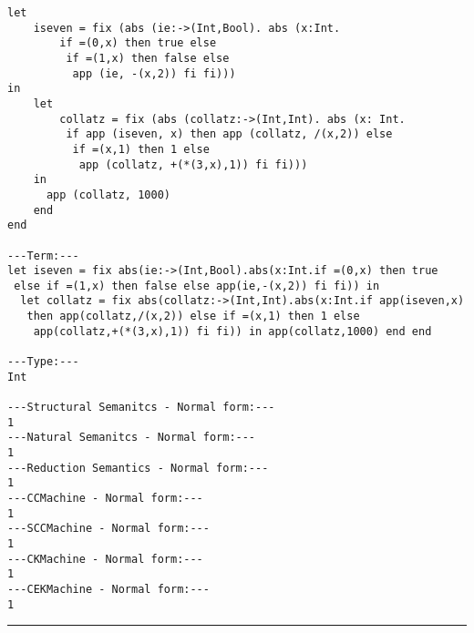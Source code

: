 \documentclass[10pt]{article}
\newcommand{\horrule}[1]{\rule{\linewidth}{#1}}
\begin{document}
\begin{lstlisting}
let
	iseven = fix (abs (ie:->(Int,Bool). abs (x:Int.
		if =(0,x) then true else
		 if =(1,x) then false else
		  app (ie, -(x,2)) fi fi)))
in
	let
		collatz = fix (abs (collatz:->(Int,Int). abs (x: Int.
		 if app (iseven, x) then app (collatz, /(x,2)) else
		  if =(x,1) then 1 else
		   app (collatz, +(*(3,x),1)) fi fi)))
	in
	  app (collatz, 1000)
	end
end

---Term:---
let iseven = fix abs(ie:->(Int,Bool).abs(x:Int.if =(0,x) then true
 else if =(1,x) then false else app(ie,-(x,2)) fi fi)) in
  let collatz = fix abs(collatz:->(Int,Int).abs(x:Int.if app(iseven,x)
   then app(collatz,/(x,2)) else if =(x,1) then 1 else
    app(collatz,+(*(3,x),1)) fi fi)) in app(collatz,1000) end end

---Type:---
Int

---Structural Semanitcs - Normal form:---
1
---Natural Semanitcs - Normal form:---
1
---Reduction Semantics - Normal form:---
1
---CCMachine - Normal form:---
1
---SCCMachine - Normal form:---
1
---CKMachine - Normal form:---
1
---CEKMachine - Normal form:---
1
\end{lstlisting}

\horrule{0.5pt} \\[0.2cm]	
\end{document}
